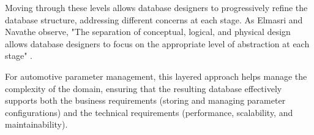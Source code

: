 Moving through these levels allows database designers to progressively refine the database structure, addressing different concerns at each stage. As Elmasri and Navathe observe, "The separation of conceptual, logical, and physical design allows database designers to focus on the appropriate level of abstraction at each stage" \cite{elmasri2015fundamentals}.

For automotive parameter management, this layered approach helps manage the complexity of the domain, ensuring that the resulting database effectively supports both the business requirements (storing and managing parameter configurations) and the technical requirements (performance, scalability, and maintainability).